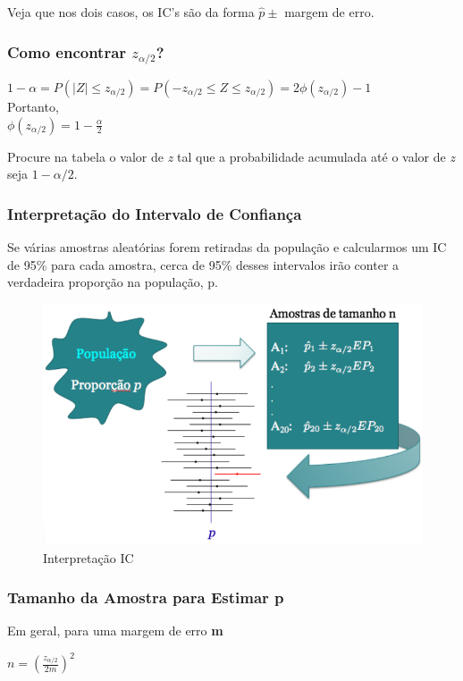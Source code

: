 \documentclass[a4paper, 12pt]{article}
\begin{document}
	Veja que nos dois casos, os IC's são da forma $\hat{p}\pm$ margem de erro.
	
\subsubsection{Como encontrar $z_{\alpha/2}$?}
	\begin{center}
		\Large
		$
		1-\alpha = P(|Z| \leq z_{\alpha /2}) = P(-z_{\alpha /2} \leq Z \leq z_{\alpha /2}) = 2\phi (z_{\alpha /2}) -1
		$\\ Portanto,\\
		$
		\phi (z_{\alpha /2}) = 1 - \frac{\alpha}{2} 
		$
	\end{center}
	Procure na tabela o valor de \textit{z} tal que a probabilidade acumulada até o valor de \textit{z} seja $1-\alpha /2$.

\newpage
\subsubsection{Interpretação do Intervalo de Confiança}
	Se várias amostras aleatórias forem retiradas da população e calcularmos um IC de 95\% para cada amostra, cerca de 95\% desses intervalos irão conter a verdadeira proporção na população, p.
	\begin{figure}[h]
		\centering
		\includegraphics[width=0.7\linewidth]{imagens/ic}
		\caption{Interpretação IC}
		\label{fig:ic}
	\end{figure}
	
\subsubsection{Tamanho da Amostra para Estimar p}
	Em geral, para uma margem de erro \textbf{m}
	\begin{center}
		\Large
		$
		n = (\frac{z_{\alpha /2}}{2m})^2
		$
	\end{center}
\end{document}
